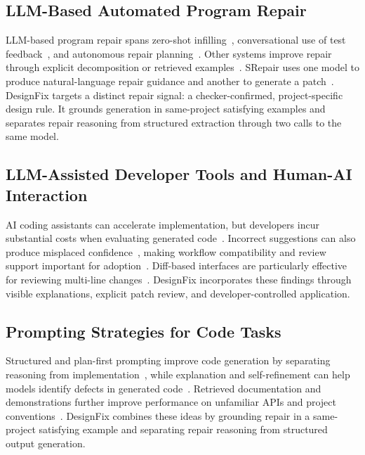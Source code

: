 \subsection{LLM-Based Automated Program Repair}
\label{sec:related-apr}
LLM-based program repair spans zero-shot infilling~\cite{xia2022alpharepair}, conversational use of test feedback~\cite{xia2024chatrepair}, and autonomous repair planning~\cite{bouzenia2025repairagent}. Other systems improve repair through
explicit decomposition or retrieved examples~\cite{joshi2023ring,wang2023rapgen,jin2023inferfix}. SRepair uses one
model to produce natural-language repair guidance and another to
generate a patch~\cite{xiang2024srepair}. DesignFix targets a distinct
repair signal: a checker-confirmed, project-specific design rule. It
grounds generation in same-project satisfying examples and separates
repair reasoning from structured extraction through two calls to the
same model.

\subsection{LLM-Assisted Developer Tools and Human-AI Interaction}
\label{sec:related-hai}
AI coding assistants can accelerate implementation, but developers
incur substantial costs when evaluating generated code~\cite{liang2024survey,barke2023grounded}. Incorrect suggestions can
also produce misplaced confidence~\cite{perry2023insecure}, making
workflow compatibility and review support important for adoption~\cite{russo2024navigating}. Diff-based interfaces are particularly
effective for reviewing multi-line changes~\cite{vaithilingam2023intellicode}. DesignFix incorporates these
findings through visible explanations, explicit patch review, and
developer-controlled application.

\subsection{Prompting Strategies for Code Tasks}
\label{sec:related-prompting}
Structured and plan-first prompting improve code generation by
separating reasoning from implementation~\cite{li2024scot,jiang2024selfplanning}, while explanation and
self-refinement can help models identify defects in generated code~\cite{chen2024selfdebug,madaan2023selfrefine}. Retrieved documentation
and demonstrations further improve performance on unfamiliar APIs and
project conventions~\cite{zhou2023docprompting,nashid2023cedar}.
DesignFix combines these ideas by grounding repair in a same-project
satisfying example and separating repair reasoning from structured
output generation.

